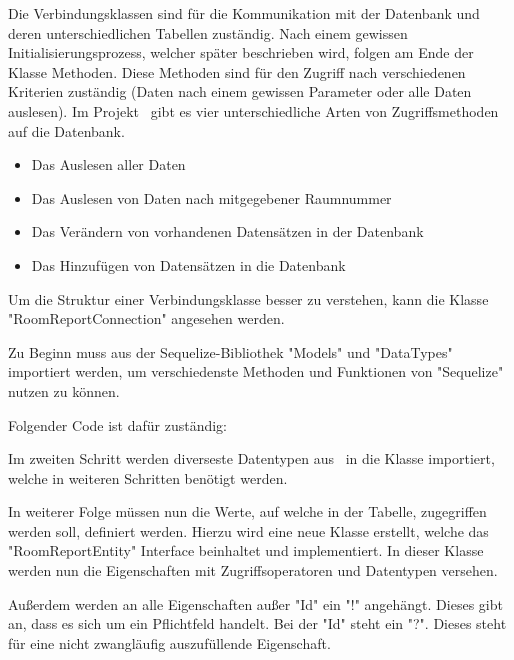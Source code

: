 
Die Verbindungsklassen sind für die Kommunikation mit der Datenbank und deren unterschiedlichen Tabellen zuständig. Nach einem gewissen Initialisierungsprozess, welcher später beschrieben wird, folgen am Ende der Klasse Methoden. Diese Methoden sind für den Zugriff nach verschiedenen Kriterien zuständig (Daten nach einem gewissen Parameter oder alle Daten auslesen). Im Projekt \ZELIA\ gibt es vier unterschiedliche Arten von Zugriffsmethoden auf die Datenbank.

\begin{itemize}
    \item Das Auslesen aller Daten
    \item Das Auslesen von Daten nach mitgegebener Raumnummer
    \item Das Verändern von vorhandenen Datensätzen in der Datenbank
    \item Das Hinzufügen von Datensätzen in die Datenbank
\end{itemize}

Um die Struktur einer Verbindungsklasse besser zu verstehen, kann die Klasse "RoomReportConnection" angesehen werden.

Zu Beginn muss aus der Sequelize-Bibliothek "Models" und "DataTypes" importiert werden, um verschiedenste Methoden und Funktionen von "Sequelize" nutzen zu können. 

Folgender Code ist dafür zuständig:


Im zweiten Schritt werden diverseste Datentypen aus \ZELIA\ in die Klasse importiert, welche in weiteren Schritten benötigt werden.

In weiterer Folge müssen nun die Werte, auf welche in der Tabelle, zugegriffen werden soll, definiert werden. Hierzu wird eine neue Klasse erstellt, welche das "RoomReportEntity" Interface beinhaltet und implementiert. In dieser Klasse werden nun die Eigenschaften mit Zugriffsoperatoren und Datentypen versehen. 

Außerdem werden an alle Eigenschaften außer "Id" ein "!" angehängt. Dieses gibt an, dass es sich um ein Pflichtfeld handelt. Bei der "Id" steht ein "?". Dieses steht für eine nicht zwangläufig auszufüllende Eigenschaft.


